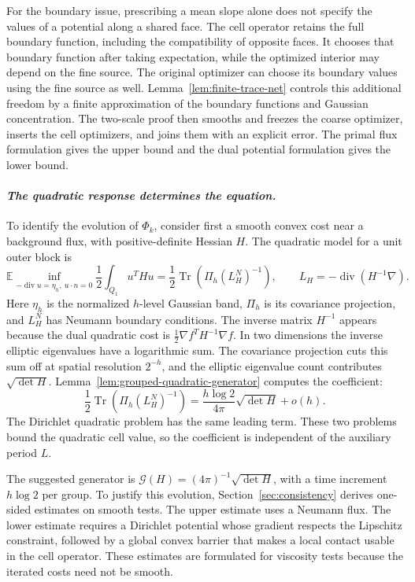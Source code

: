 \documentclass{aomart}
\theoremstyle{definition}
\newcommand{\1}{\mathbf 1}
\begin{document}
For the boundary issue, prescribing a mean slope alone does not specify
the values of a potential along a shared face.  The cell operator retains
the full boundary function, including the compatibility of opposite
faces.  It chooses that boundary function after taking expectation, while
the optimized interior may depend on the fine source.  The original
optimizer can choose its boundary values using the fine source as well.
Lemma~\ref{lem:finite-trace-net} controls this additional freedom by a
finite approximation of the boundary functions and Gaussian concentration.
The two-scale proof then smooths and freezes the coarse optimizer, inserts
the cell optimizers, and joins them with an explicit error.  The primal
flux formulation gives the upper bound and the dual potential formulation
gives the lower bound.

\smallskip
\paragraph{\textit{The quadratic response determines the equation.}}
To identify the evolution of $\Phi_k$, consider first a smooth convex cost
near a background flux, with positive-definite Hessian $H$.  The
quadratic model for a unit outer block is
\[
\mathbb E\inf_{-\operatorname{div}u=\eta_h,\ u\cdot n=0}
\frac12\int_{Q_1}u^THu
=\frac12\operatorname{Tr}\!\left(\Pi_h(L_H^N)^{-1}\right),
\qquad L_H=-\operatorname{div}(H^{-1}\nabla).
\]
Here $\eta_h$ is the normalized $h$-level Gaussian band, $\Pi_h$ is its
covariance projection, and $L_H^N$ has Neumann boundary conditions.
The inverse matrix $H^{-1}$ appears because the dual quadratic cost is
$\frac12\nabla f^TH^{-1}\nabla f$.
In two dimensions the inverse elliptic eigenvalues have a logarithmic
sum.  The covariance projection cuts this sum off at spatial resolution
$2^{-h}$, and the elliptic eigenvalue count contributes
$\sqrt{\det H}$.  Lemma~\ref{lem:grouped-quadratic-generator} computes
the coefficient:
\[
\frac12\operatorname{Tr}\!\left(\Pi_h(L_H^N)^{-1}\right)
=\frac{h\log2}{4\pi}\sqrt{\det H}+o(h).
\]
The Dirichlet quadratic problem has the same leading term.  These two
problems bound the quadratic cell value, so the coefficient is independent
of the auxiliary period $L$.

The suggested generator is $\mathcal G(H)=(4\pi)^{-1}\sqrt{\det H}$,
with a time increment $h\log2$ per group.  To justify this evolution,
Section~\ref{sec:consistency} derives one-sided estimates
on smooth tests.  The upper estimate uses a Neumann flux.  The lower
estimate requires a Dirichlet potential whose gradient respects the
Lipschitz constraint, followed by a global convex barrier that makes a
local contact usable in the cell operator.  These estimates are formulated
for viscosity tests because the iterated costs need not be smooth.
\end{document}
